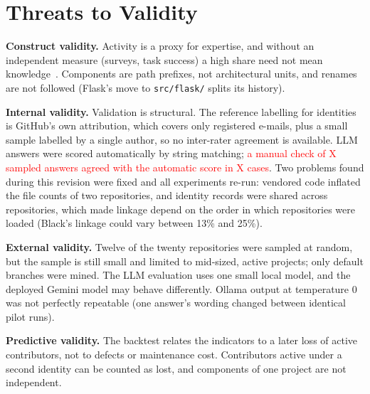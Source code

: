 \documentclass[conference]{IEEEtran}
\newcommand{\fixme}[1]{\textcolor{red}{#1}}
\newcommand{\res}[1]{#1}
\newcommand{\code}[1]{\texttt{\small #1}}
\begin{document}
\section{Threats to Validity}
\textbf{Construct validity.} Activity is a proxy for expertise, and without an independent measure (surveys, task success) a high share need not mean knowledge~\cite{fritz2010dok}. Components are path prefixes, not architectural units, and renames are not followed (Flask's move to \code{src/flask/} splits its history).

\textbf{Internal validity.} Validation is structural. The reference labelling for identities is GitHub's own attribution, which covers only registered e-mails, plus a small sample labelled by a single author, so no inter-rater agreement is available. LLM answers were scored automatically by string matching; \fixme{a manual check of X sampled answers agreed with the automatic score in X cases}. Two problems found during this revision were fixed and all experiments re-run: vendored code inflated the file counts of two repositories, and identity records were shared across repositories, which made linkage depend on the order in which repositories were loaded (Black's linkage could vary between \res{13\%} and \res{25\%}).

\textbf{External validity.} Twelve of the twenty repositories were sampled at random, but the sample is still small and limited to mid-sized, active projects; only default branches were mined. The LLM evaluation uses one small local model, and the deployed Gemini model may behave differently. Ollama output at temperature 0 was not perfectly repeatable (one answer's wording changed between identical pilot runs).

\textbf{Predictive validity.} The backtest relates the indicators to a later loss of active contributors, not to defects or maintenance cost. Contributors active under a second identity can be counted as lost, and components of one project are not independent.

\end{document}

